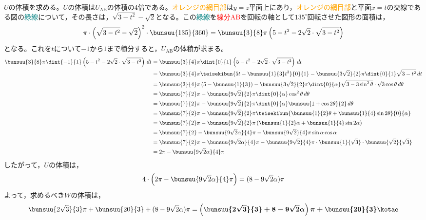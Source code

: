 \documentclass[../../../doc/main]{subfiles}
\begin{document}
\begin{itemize}
                \noindent
                $U$の体積を求める。$U$の体積は$U_{\text{AB}}$の体積の4倍である。\textcolor{orange}{オレンジの網目部}は$y=z$平面上にあり，\textcolor{orange}{オレンジの網目部}と平面$x=t$の交線である図の\textcolor{teal}{緑線}について，その長さは，$\sqrt{3-t^2}-\sqrt{2}$となる。この\textcolor{teal}{緑線}を\textcolor{red}{線分AB}を回転の軸として$135^\circ$回転させた図形の面積は，
                \begin{align*}
                    \pi\cdot\left(\sqrt{3-t^2}-\sqrt{2}\right)^2\cdot\bunsuu{135}{360}=\bunsuu{3}{8}\pi\left(5-t^2-2\sqrt{2}\cdot\sqrt{3-t^2}\right)
                \end{align*}
                となる。これを$t$について$-1$から$1$まで積分すると，$U_{\text{AB}}$の体積が求まる。
                \begin{align*}
                    \bunsuu{3}{8}\pi\dint{-1}{1}\left(5-t^2-2\sqrt{2}\cdot\sqrt{3-t^2}\right)\,dt&=\bunsuu{3}{4}\pi\dint{0}{1}\left(5-t^2-2\sqrt{2}\cdot\sqrt{3-t^2}\right)\,dt \\
                    &=\bunsuu{3}{4}\pi\teisekibun{5t-\bunsuu{1}{3}t^3}{0}{1}-\bunsuu{3\sqrt{2}}{2}\pi\dint{0}{1}\sqrt{3-t^2}\,dt \\
                    &=\bunsuu{3}{4}\pi\left(5-\bunsuu{1}{3}\right)-\bunsuu{3\sqrt{2}}{2}\pi\dint{0}{\alpha}\sqrt{3-3\sin^2{\theta}}\cdot\sqrt{3}\cos{\theta}\,d\theta \\
                    &=\bunsuu{7}{2}\pi-\bunsuu{9\sqrt{2}}{2}\pi\dint{0}{\alpha}\cos^2{\theta}\,d\theta \\
                    &=\bunsuu{7}{2}\pi-\bunsuu{9\sqrt{2}}{2}\pi\dint{0}{\alpha}\bunsuu{1+\cos{2\theta}}{2}\,d\theta \\
                    &=\bunsuu{7}{2}\pi-\bunsuu{9\sqrt{2}}{2}\pi\teisekibun{\bunsuu{1}{2}\theta+\bunsuu{1}{4}\sin{2\theta}}{0}{\alpha} \\
                    &=\bunsuu{7}{2}\pi-\bunsuu{9\sqrt{2}}{2}\pi\left(\bunsuu{1}{2}\alpha+\bunsuu{1}{4}\sin{2\alpha}\right) \\
                    &=\bunsuu{7}{2}-\bunsuu{9\sqrt{2}\alpha}{4}\pi-\bunsuu{9\sqrt{2}}{4}\pi\sin{\alpha}\cos{\alpha} \\
                    &=\bunsuu{7}{2}\pi-\bunsuu{9\sqrt{2}\alpha}{4}\pi-\bunsuu{9\sqrt{2}}{4}\pi\cdot\bunsuu{1}{\sqrt{3}}\cdot\bunsuu{\sqrt{2}}{\sqrt{3}} \\
                    &=2\pi-\bunsuu{9\sqrt{2}\alpha}{4}\pi
                \end{align*}
                したがって，$U$の体積は，
                \begin{align*}
                    4\cdot\left(2\pi-\bunsuu{9\sqrt{2}\alpha}{4}\pi\right)=(8-9\sqrt{2}\alpha)\pi
                \end{align*}
                よって，求めるべき$W$の体積は，
                \begin{align*}
                    \bunsuu{2\sqrt{3}}{3}\pi+\bunsuu{20}{3}+(8-9\sqrt{2}\alpha)\pi=\boldsymbol{\left(\bunsuu{2\sqrt{3}}{3}+8-9\sqrt{2}\alpha\right)\pi+\bunsuu{20}{3}}\kotae
                \end{align*}
    \end{itemize}
\end{document}
